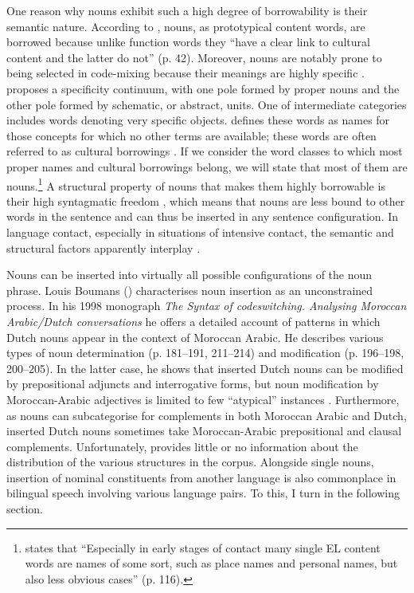 One reason why nouns exhibit such a high degree of borrowability is their semantic nature. According to \citet{van-hout-muysken}, nouns, as prototypical content words, are borrowed because unlike function words they ``have a clear link to cultural content and the latter do not'' (p. 42). Moreover, nouns are notably prone to being selected in code-mixing because their meanings are highly specific \citep{backus-two-1996,backus-2001,field-2002}. \citet[115--131]{backus-two-1996} proposes a specificity continuum, with one pole formed by proper nouns and the other pole formed by schematic, or abstract, units. One of intermediate categories includes words denoting very specific objects. \citet[116]{backus-two-1996} defines these words as names for those concepts for which no other terms are available; these words are often referred to as cultural borrowings \citep[cf.][165]{myers-scotton-duelling-1993}. If we consider the word classes to which most proper names and cultural borrowings belong, we will state that most of them are nouns.\footnote{
\citet{backus-two-1996} states that ``Especially in early stages of contact many single EL content words are names of some sort, such as place names and personal names, but also less obvious cases'' (p. 116).} A structural property of nouns that makes them highly borrowable is their high syntagmatic freedom \citep{backus-13}, which means that nouns are less bound to other words in the sentence and can thus be inserted in any sentence configuration. In language contact, especially in situations of intensive contact, the semantic and structural factors apparently interplay \citep[cf.][]{van-hout-muysken}.

Nouns can be inserted into virtually all possible configurations of the noun phrase. Louis Boumans (\citeyear[221]{boumans-syntax-1998}) characterises noun insertion as an unconstrained process. In his 1998 monograph \textit{The Syntax of codeswitching. Analysing Moroccan Arabic/Dutch conversations} he offers a detailed account of patterns in which Dutch nouns appear in the context of Moroccan Arabic. He describes various types of noun determination (p. 181--191, 211--214) and modification (p. 196--198, 200--205). In the latter case, he shows that inserted Dutch nouns can be modified by prepositional adjuncts and interrogative forms, but noun modification by Moroccan-Arabic adjectives is limited to few ``atypical'' instances \citep[200--201]{boumans-syntax-1998}. Furthermore, as nouns can subcategorise for complements in both Moroccan Arabic and Dutch, inserted Dutch nouns sometimes take Moroccan-Arabic prepositional and clausal complements. Unfortunately, \citet{boumans-syntax-1998} provides little or no information about the distribution of the various structures in the corpus.
Alongside single nouns, insertion of nominal constituents from another language is also commonplace in bilingual speech involving various language pairs. To this, I turn in the following section.

